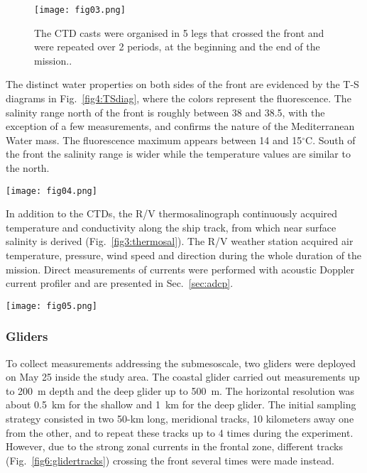 \documentclass[essd]{copernicus}
\begin{document}
\begin{figure}[t]
\texttt{[image: fig03.png]}
\caption{The CTD casts were organised in 5 legs that crossed the front and were repeated over 2 periods, at the beginning and the end of the mission.\label{fig3:CTD}.}
\end{figure}

The distinct water properties on both sides of the front are evidenced by the T-S diagrams in Fig.~\ref{fig4:TSdiag}, where the colors represent the fluorescence. The salinity range north of the front is roughly between 38 and 38.5, with the exception of a few measurements, and confirms the nature of the Mediterranean Water mass. The fluorescence maximum appears between 14 and 15$^{\circ}$C. South of the front the salinity range is wider while the temperature values are similar to the north.

\begin{figure*}[t]
\texttt{[image: fig04.png]}
\caption{The T-S diagrams are shown separately for the casts located north and south of the front (broad, dashed line) \label{fig4:TSdiag}.}
\end{figure*}

In addition to the CTDs, the R/V thermosalinograph continuously acquired temperature and conductivity along the ship track, from which near surface salinity is derived (Fig.~\ref{fig3:thermosal}). The R/V weather station acquired air temperature, pressure, wind speed and direction during the whole duration of the mission. Direct measurements of currents were performed with acoustic Doppler current profiler and are presented in Sec.~\ref{sec:adcp}. 

\begin{figure*}[t]
\texttt{[image: fig05.png]}
\caption{The near-surface salinity (colored dots) measured by the thermosalinograph evidences the strong horizontal gradients, in agreement with the front position as obtained using the SST (broad, dashed line). The 5 subplots depict the temperature and salinity along select meridional tracks. \label{fig3:thermosal}}
\end{figure*}

\subsubsection{Gliders}

To collect measurements addressing the submesoscale, two gliders were deployed on May 25 inside the study area. The coastal glider carried out measurements up to 200~m depth and the deep glider up to 500~m. The horizontal resolution was about 0.5~km for the shallow and 1~km for the deep glider. The initial sampling strategy consisted in two 50-km long, meridional tracks, 10 kilometers away one from the other, and to repeat these tracks up to 4 times during the experiment. However, due to the strong zonal currents in the frontal zone, different tracks (Fig.~\ref{fig6:glidertracks}) crossing the front several times were made instead.
\end{document}
